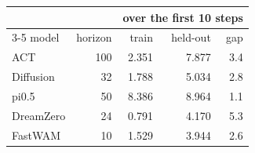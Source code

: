 \begin{tabular}{lrrrr}
\toprule
& & \multicolumn{3}{c}{over the first 10 steps} \\
\cmidrule(lr){3-5}
model & horizon & train & held-out & gap \\
\midrule
ACT & 100 & 2.351 & 7.877 & 3.4 \\
Diffusion & 32 & 1.788 & 5.034 & 2.8 \\
pi0.5 & 50 & 8.386 & 8.964 & 1.1 \\
DreamZero & 24 & 0.791 & 4.170 & 5.3 \\
FastWAM & 10 & 1.529 & 3.944 & 2.6 \\
\bottomrule
\end{tabular}
